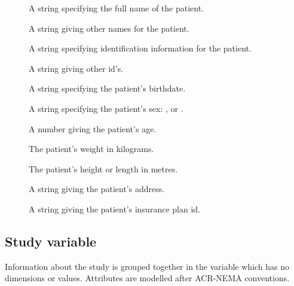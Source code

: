\begin{description}
   \item [] A string specifying the full name of the
      patient.
   \item [] A string giving other names for the
      patient. 
   \item [] A string specifying identification
      information for the patient.
   \item [] A string giving other id's.
   \item [] A string specifying the patient's
      birthdate.
   \item [] A string specifying the patient's sex:
      ,  or .
   \item [] A number giving the patient's age.
   \item [] The patient's weight in kilograms.
   \item [] The patient's height or length in metres.
   \item [] A string giving the patient's address.
   \item [] A string giving the patient's
      insurance plan id.
\end{description}

\subsection{Study variable}

Information about the study is grouped together in the 
variable which has no dimensions or values. Attributes are modelled
after ACR-NEMA conventions.


